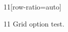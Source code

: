 \documentclass[paper=A4]{ropas-poster}
\begin{document}
\begin{postergrid}{1}{1}[row-ratio={auto}]
\begin{posterblock}{1}{1}
Grid option test.
\end{posterblock}
\end{postergrid}
\end{document}
